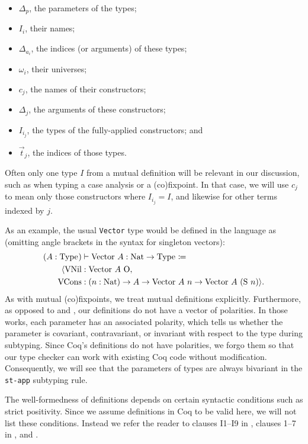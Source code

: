 \documentclass[sigplan,10pt,anonymous,review,nonacm]{acmart}
\begin{document}
\begin{itemize}
    \item $\Delta_p$, the parameters of the \coinductive types;
    \item $I_i$, their names;
    \item $\Delta_{a_i}$, the indices (or arguments) of these \coinductive types;
    \item $\omega_i$, their universes;
    \item $c_j$, the names of their constructors;
    \item $\Delta_j$, the arguments of these constructors;
    \item $I_{i_j}$, the \coinductive types of the fully-applied constructors; and
    \item $\vec{t}_j$, the indices of those \coinductive types.
\end{itemize}

Often only one \coinductive type $I$ from a mutual definition will be relevant in our discussion, such as when typing a case analysis or a (co)\-fixpoint. In that case, we will use $c_j$ to mean only those constructors where $I_{i_j} = I$, and likewise for other terms indexed by $j$.

As an example, the usual \texttt{Vector} type would be defined in the language as (omitting angle brackets in the syntax for singleton vectors):
\begin{align*}
    (A : \Type{}) &\vdash \text{Vector}\ A: \text{Nat} \to \Type{} \coloneqq \\
        \langle \text{VNil} &: \text{Vector}\ A\ \text{O}, \\
        \text{VCons} &: (n: \text{Nat}) \to A \to \text{Vector}\ A\ n \to \text{Vector}\ A\ (\text{S}\ n) \rangle.
\end{align*}
As with mutual (co)\-fixpoints, we treat mutual \coinductive definitions explicitly. Furthermore, as opposed to \CIChat and \CIChatbar, our definitions do not have a vector of polarities. In those works, each parameter has an associated polarity, which tells us whether the parameter is covariant, contravariant, or invariant with respect to the \coinductive type during subtyping. Since Coq's \coinductive definitions do not have polarities, we forgo them so that our type checker can work with existing Coq code without modification. Consequently, we will see that the parameters of \coinductive types are always bivariant in the \texttt{st-app} subtyping rule.

The well-formedness of \coinductive definitions depends on certain syntactic conditions such as strict positivity. Since we assume definitions in Coq to be valid here, we will not list these conditions. Instead we refer the reader to clauses I1--I9 in \cite{cic-hat-bar}, clauses 1--7 in \cite{cic-hat}, and \cite{coq}.
\end{document}
